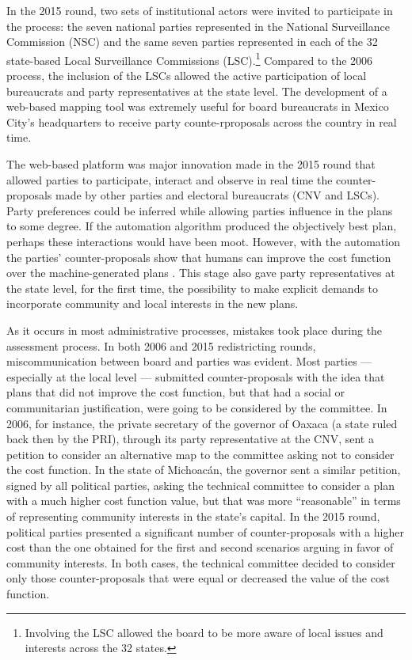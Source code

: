 \documentclass[letter,12pt]{article}
\begin{document}
In the 2015 round, two sets of institutional actors were invited to participate in the process: the seven national parties represented in the National Surveillance Commission (NSC) and the same seven parties represented in each of the 32 state-based Local Surveillance Commissions (LSC).\footnote{Involving the LSC allowed the board to be more aware of local issues and interests across the 32 states.} Compared to the 2006 process, the inclusion of the LSCs allowed the active participation of local bureaucrats and party representatives at the state level. The development of a web-based mapping tool was extremely useful for board bureaucrats in Mexico City's headquarters to receive party counte-rproposals across the country in real time.

The web-based platform was major innovation made in the 2015 round that allowed parties to participate, interact and observe in real time the counter-proposals made by other parties and electoral bureaucrats (CNV and LSCs). Party preferences could be inferred while allowing parties influence in the plans to some degree. If the automation algorithm produced the objectively best plan, perhaps these interactions would have been moot. However, with the automation the parties' counter-proposals show that humans can improve the cost function over the machine-generated plans \citep{altman.mcdonald2011bard}. This stage also gave party representatives at the state level, for the first time, the possibility to make explicit demands to incorporate community and local interests in the new plans.

As it occurs in most administrative processes, mistakes took place during the assessment process. In both 2006 and 2015 redistricting rounds, miscommunication between board and parties was evident. Most parties ---especially at the local level --- submitted counter-proposals with the idea that plans that did not improve the cost function, but that had a social or communitarian justification, were going to be considered by the committee. In 2006, for instance, the private secretary of the governor of Oaxaca (a state ruled back then by the PRI), through its party representative at the CNV, sent a petition to consider an alternative map to the committee asking not to consider the cost function. In the state of Michoac\'an, the governor sent a similar petition, signed by all political parties, asking the technical committee to consider a plan with a much higher cost function value, but that was more ``reasonable'' in terms of representing community interests in the state's capital. In the 2015 round, political parties presented a significant number of counter-proposals with a higher cost than the one obtained for the first and second scenarios arguing in favor of community interests. In both cases, the technical committee decided to consider only those counter-proposals that were equal or decreased the value of the cost function.  
\end{document}
